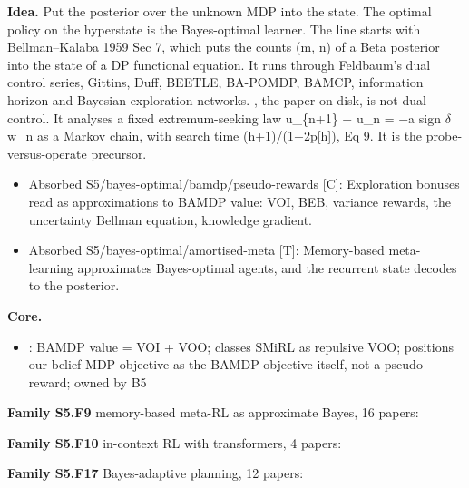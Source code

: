 \documentclass[10pt]{article}
\newcommand{\memb}[1]{\par\smallskip\textbf{#1}\quad}
\begin{document}
\textbf{Idea.} Put the posterior over the unknown MDP into the state. The optimal policy on the hyperstate is the Bayes-optimal learner. The line starts with Bellman--Kalaba 1959 Sec 7, which puts the counts (m, n) of a Beta posterior into the state of a DP functional equation. It runs through Feldbaum's dual control series, Gittins, Duff, BEETLE, BA-POMDP, BAMCP, information horizon and Bayesian exploration networks. \citet{Feldbaum-problems60}, the paper on disk, is not dual control. It analyses a fixed extremum-seeking law u\_\{n+1\} \ensuremath{-} u\_n = \ensuremath{-}a sign \ensuremath{\delta}w\_n as a Markov chain, with search time (h+1)/(1\ensuremath{-}2p[h]), Eq 9. It is the probe-versus-operate precursor.
\begin{itemize}[nosep,leftmargin=1.2em]
\item Absorbed S5/bayes-optimal/bamdp/pseudo-rewards [C]: Exploration bonuses read as approximations to BAMDP value: VOI, BEB, variance rewards, the uncertainty Bellman equation, knowledge gradient.
\item Absorbed S5/bayes-optimal/amortised-meta [T]: Memory-based meta-learning approximates Bayes-optimal agents, and the recurrent state decodes to the posterior.
\end{itemize}


\memb{Core.}
\begin{itemize}[nosep,leftmargin=1.2em]
\item \citet{Lidayan-bamdp25}: BAMDP value = VOI + VOO; classes SMiRL as repulsive VOO; positions our belief-MDP objective as the BAMDP objective itself, not a pseudo-reward; owned by B5
\end{itemize}
\memb{Family S5.F9} memory-based meta-RL as approximate Bayes, 16 papers: {\footnotesize \citetext{\citealp{Duan-rl16}; \citealp{Ortega-metalearning19}; \citealp{Zintgraf-varibad19}; \citealp{Mikulik-metatrained20}; \citealp{Wang-learning16}; \citealp{Stadie-considerations18}; \citealp{Humplik-meta19}; \citealp{Rakelly-efficient19}; \citealp{Dorfman-offline20}; \citealp{Liu-decoupling20}; \citealp{Zintgraf-exploration20}; \citealp{Beck-tutorial23}; \citealp{Choshen-contrabar23}; \citealp{Genewein-memory23}; \citealp{Norman-first23}; \citealp{Zhang-beyond25}}}

\memb{Family S5.F10} in-context RL with transformers, 4 papers: {\footnotesize \citetext{\citealp{Laskin-context22}; \citealp{Lee-supervised23}; \citealp{Lin-transformers23}; \citealp{Wagenmaker-behavioral25}}}

\memb{Family S5.F17} Bayes-adaptive planning, 12 papers: {\footnotesize \citetext{\citealp{Bellman-adaptive59}; \citealp{Duff-optimal02}\dag; \citealp{Guez-efficient12}; \citealp{Arumugam-planning22}; \citealp{Fellows-bayesian23}; \citealp{Martin-bayesian67}\dag; \citealp{Poupart-analytic06}; \citealp{Ross-bayesadaptive07}\dag; \citealp{Guez-better14}; \citealp{Ghavamzadeh-bayesian16}; \citealp{Katt-learning18}; \citealp{Greshler-bayesian24}}}
\end{document}
